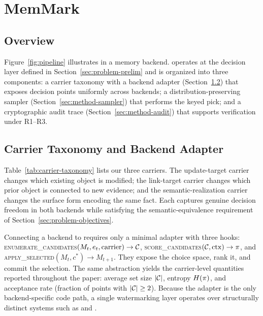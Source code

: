 \section{MemMark}
\label{sec:method}


\subsection{Overview}
\label{sec:method-overview}
Figure~\ref{fig:pipeline} illustrates \memmark{} in a memory backend.
\memmark{} operates at the decision layer defined in
Section~\ref{sec:problem-prelim} and is organized into three components:
a carrier taxonomy with a backend adapter
(Section~\ref{sec:method-carrier}) that exposes decision points uniformly
across backends; a distribution-preserving sampler
(Section~\ref{sec:method-sampler}) that performs the keyed pick; and a
cryptographic audit trace (Section~\ref{sec:method-audit}) that supports
verification under R1--R3.


\subsection{Carrier Taxonomy and Backend Adapter}
\label{sec:method-carrier}


Table~\ref{tab:carrier-taxonomy} lists our three carriers. The
update-target carrier changes which existing object is modified; the
link-target carrier changes which prior object is connected to new
evidence; and the semantic-realization carrier changes the surface form
encoding the same fact. Each captures genuine decision freedom in both
backends while satisfying the semantic-equivalence requirement of
Section~\ref{sec:problem-objectives}.

Connecting a backend to \memmark{} requires only a minimal adapter with
three hooks:
\textsc{enumerate\_candidates}$(M_t,e_t,\mathrm{carrier})\to\mathcal{C}$,
\textsc{score\_candidates}$(\mathcal{C},\mathrm{ctx})\to\pi$, and
\textsc{apply\_selected}$(M_t,c^*)\to M_{t+1}$. They expose the choice
space, rank it, and commit the selection. The same abstraction yields the
carrier-level quantities reported throughout the paper: average set size
$|\mathcal{C}|$, entropy $H(\pi)$, and acceptance rate (fraction of
points with $|\mathcal{C}|\ge 2$). Because the adapter is the only
backend-specific code path, a single watermarking layer operates over
structurally distinct systems such as \amem{} and \graphiti{}.



